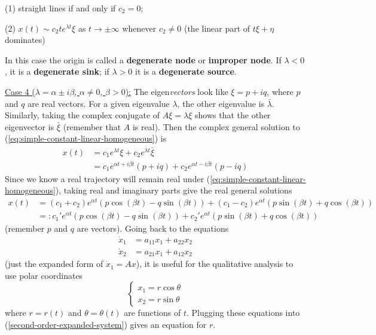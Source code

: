 \documentclass[11pt, letterpaper, oneside]{article}     %
\numberwithin{equation}{subsection}
\theoremstyle{definition}
\numberwithin{theorem}{section}
\theoremstyle{remark}
\begin{document}
(1) straight lines if and only if $c_2 = 0$;

(2) $x(t) \sim c_2 te^{\lambda t} \xi$ as $t\to\pm\infty$ whenever $c_2 \neq 0$ (the linear part of $t\xi + \eta$ dominates)

In this case the origin is called a \textbf{degenerate node} or \textbf{improper node}. If $\lambda < 0$, it is a \textbf{degenerate sink}; if $\lambda > 0$ it is a \textbf{degenerate source}.

\bigskip

\noindent
\underline{Case 4 ($\lambda = \alpha \pm i\beta$, $\alpha \neq 0$, $\beta > 0$):} The eigen\emph{vectors} look like $\xi = p + iq$, where $p$ and $q$ are real vectors. For a given eigenvalue $\lambda$, the other eigenvalue is $\bar\lambda$. Similarly, taking the complex conjugate of $A\xi = \lambda \xi$ shows that the other eigenvector is $\bar\xi$ (remember that $A$ is real). Then the complex general solution to (\ref{eq:simple-constant-linear-homogeneous}) is
\begin{align}
  x(t) &= c_1e^{\lambda t}\xi + c_2e^{\bar\lambda t}\bar\xi\\
  &= c_1e^{\alpha t + i\beta t}(p + iq) + c_2e^{\alpha t - i\beta t}(p - iq)
\end{align}
Since we know a real trajectory will remain real under (\ref{eq:simple-constant-linear-homogeneous}), taking real and imaginary parts give the real general solutions
\begin{align}
  x(t) &= (c_1 + c_2)e^{\alpha t}(p\cos(\beta t) - q\sin(\beta t))
  + (c_1 - c_2)e^{\alpha t}(p\sin(\beta t) + q\cos(\beta t))\\
  &=: c_1'e^{\alpha t}(p\cos(\beta t) - q\sin(\beta t))
  + c_2'e^{\alpha t}(p\sin(\beta t) + q\cos(\beta t))
\end{align}
(remember $p$ and $q$ are vectors). Going back to the equations
\begin{align}\label{second-order-expanded-system}
  \dot x_1 &= a_{11}x_1 + a_{22}x_2\\
  \dot x_2 &= a_{21}x_1 + a_{12}x_2
\end{align}
(just the expanded form of $\dot x_1 = Ax$), it is useful for the qualitative analysis to use polar coordinates
\begin{equation}
  \begin{cases}
    x_1 = r\cos\theta\\
    x_2 = r\sin\theta
  \end{cases}
\end{equation}
where $r = r(t)$ and $\theta = \theta(t)$ are functions of $t$. Plugging these equations into (\ref{second-order-expanded-system}) gives an equation for $r$.
\end{document}
